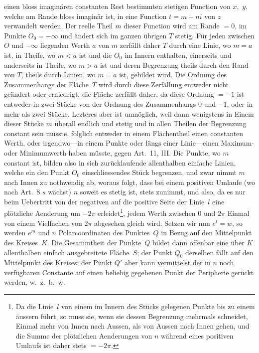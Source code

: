 \documentclass[a4paper,12pt]{article}
\begin{document}
einen bloss imagin\"{a}ren constanten Rest bestimmten stetigen
Function von $x$,~$y$, welche am Rande bloss imagin\"{a}r ist, in
eine Function $t = m + ni$ von $z$ verwandelt werden.  Der reelle
Theil $m$ dieser Function wird am Rande $= 0$, im Punkte
$O_0 = - \infty$ und \"{a}ndert sich im ganzen \"{u}brigen $T$
stetig.  F\"{u}r jeden zwischen $O$ und $-\infty$ liegenden Werth
$a$ von $m$ zerf\"{a}llt daher $T$ durch eine Linie, wo $m = a$
ist, in Theile, wo $m < a$ ist und die $O_0$ im Innern enthalten,
einerseits und anderseits in Theile, wo $m > a$ ist und deren
Begrenzung theils durch den Rand von $T$, theils durch Linien, wo
$m = a$ ist, gebildet wird.  Die Ordnung des Zusammenhangs der
Fl\"{a}che~$T$ wird durch diese Zerf\"{a}llung entweder nicht
ge\"{a}ndert oder erniedrigt, die Fl\"{a}che zerf\"{a}llt daher,
da diese Ordnung $= -1$ ist entweder in zwei St\"{u}cke von der
Ordnung des Zusammenhangs $0$ und $-1$, oder in mehr als zwei
St\"{u}cke.  Lezteres aber ist unm\"{o}glich, weil dann wenigstens
in Einem dieser St\"{u}cke $m$ \"{u}berall endlich und stetig und
in allen Theilen der Begrenzung constant sein m\"{u}sste,
folglich entweder in einem Fl\"{a}chentheil einen constanten
Werth, oder irgendwo---in einem Punkte oder l\"{a}ngs einer
Linie---einen Maximum- oder Minimumwerth haben m\"{u}sste, gegen
Art.~11, III.  Die Punkte, wo $m$ constant ist, bilden also in
sich zur\"{u}cklaufende allenthalben einfache Linien, welche ein
den Punkt $O_0$ einschliessendes St\"{u}ck begrenzen, und zwar
nimmt $m$ nach Innen zu nothwendig ab, woraus folgt, dass bei
einem positiven Umlaufe (wo nach Art.~8 $s$ w\"{a}chst) $n$
soweit es stetig ist, stets zunimmt, und also, da es nur beim
Uebertritt von der negativen auf die positive Seite der Linie~$l$
eine pl\"{o}tzliche Aenderung um $-2\pi$ erleidet\footnote{Da die
Linie~$l$ von einem im Innern des St\"{u}cks gelegenen Punkte bis
zu einem \"{a}ussern f\"{u}hrt, so muss sie, wenn sie dessen
Begrenzung mehrmals schneidet, Einmal mehr von Innen nach Aussen,
als von Aussen nach Innen gehen, und die Summe der
pl\"{o}tzlichen Aenderungen von $n$ w\"{a}hrend eines positiven
Umlaufs ist daher stets $= - 2 \pi$.}, jedem Werth zwischen $0$
und $2\pi$ Einmal von einem Vielfachen von $2\pi$ abgesehen
gleich wird.  Setzen wir nun $e^t = w$, so werden $e^m$ und $n$
Polarcoordinaten des Punktes~$Q$ in Bezug auf den Mittelpunkt des
Kreises~$K$.  Die Gesammtheit der Punkte~$Q$ bildet dann offenbar
eine \"{u}ber $K$ allenthalben einfach ausgebreitete
Fl\"{a}che~$S$; der Punkt $Q_0$ derselben f\"{a}llt auf den
Mittelpunkt des Kreises; der Punkt $Q'$ aber kann vermittelst der
in $n$ noch verf\"{u}gbaren Constante auf einen beliebig
gegebenen Punkt der Peripherie ger\"{u}ckt werden, w.~z.~b.~w.
\end{document}
